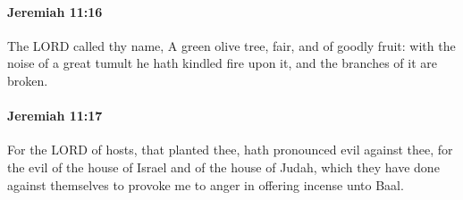 		\paragraph{Jeremiah 11:16} %
			\label{JEREMIAH-11-16}

			The LORD called thy name, A green olive tree, fair, and of goodly fruit: with the noise of a great tumult he hath kindled fire upon it, and the branches of it are broken.


		\paragraph{Jeremiah 11:17} %
			\label{JEREMIAH-11-17}

			For the LORD of hosts, that planted thee, hath pronounced evil against thee, for the evil of the house of Israel and of the house of Judah, which they have done against themselves to provoke me to anger in offering incense unto Baal.

